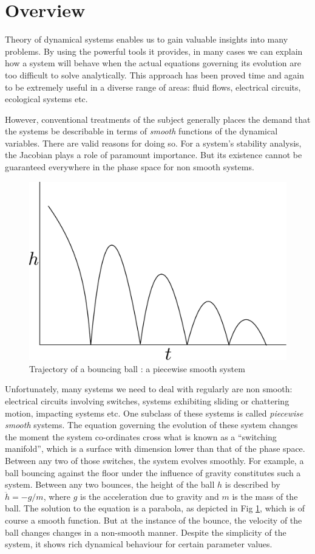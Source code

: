 \documentclass{book}
\renewcommand{\(}{\begin{columns}}
\renewcommand{\)}{\end{columns}}
\newcommand{\<}[1]{\begin{column}{#1}}
\renewcommand{\>}{\end{column}}
\begin{document}
\section{Overview}
Theory of dynamical systems enables us to gain valuable insights into many problems.  By using the powerful 
tools it provides, in many cases we can explain how a system will behave 
when the actual equations governing its evolution are too difficult to solve 
analytically.  This approach has been proved time and again to be extremely 
useful in a diverse range of areas: fluid flows, electrical circuits, 
ecological systems etc.  

However, conventional treatments of the subject generally places the demand 
that the systems be describable in terms of \emph{smooth} functions of the 
dynamical variables. There are valid reasons for doing so.  For a system's 
stability analysis, the Jacobian plays a role of paramount importance.  But 
its existence cannot be guaranteed everywhere in the phase space for non 
smooth systems.  

\begin{figure}
\caption{Trajectory of a bouncing ball : a piecewise smooth system}
\label{fig-bouncing_ball}
\begin{center}
\includegraphics[width=0.4\columnwidth]{bounce}
\end{center}
\end{figure}

Unfortunately, many systems we need to deal with regularly are non smooth: 
electrical circuits involving switches, systems exhibiting sliding or 
chattering motion, impacting systems etc.  One subclass of these systems is 
called  \emph{piecewise smooth} systems. The equation governing the evolution 
of these system changes the moment  the system 
co-ordinates cross what is known as a ``switching manifold'', which is a 
surface with 
dimension lower than that of the phase space.  Between any two of those 
switches, the system evolves smoothly. For example, a ball bouncing against 
the floor under the influence of gravity constitutes such a system.  Between 
any two bounces, the height of the ball $h$ is described by $\ddot{h}=-g/m$, 
where $g$ is the acceleration due to gravity and $m$ is the mass of the ball.  
The solution to the equation is a parabola, as depicted in Fig 
\ref{fig-bouncing_ball}, which is of course a smooth function.  But at the 
instance of the bounce, the velocity of the ball changes changes in a 
non-smooth manner.  Despite the simplicity of the system, it shows rich 
dynamical behaviour for certain parameter values\cite{2010arXiv1002.2448O}.  
\end{document}

